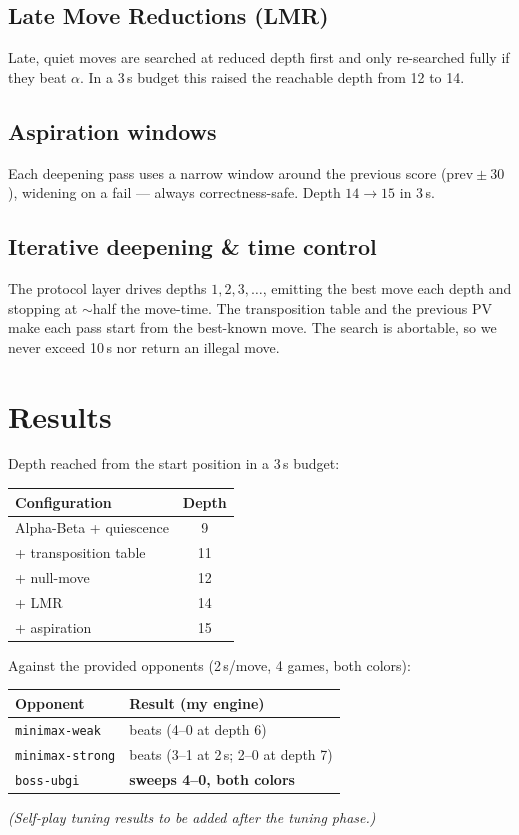 \documentclass[11pt]{article}
\begin{document}
\subsection{Late Move Reductions (LMR)}
Late, quiet moves are searched at reduced depth first and only re-searched fully
if they beat $\alpha$. In a 3\,s budget this raised the reachable depth from 12
to 14.

\subsection{Aspiration windows}
Each deepening pass uses a narrow window around the previous score
($\text{prev}\pm30$), widening on a fail --- always correctness-safe. Depth
$14\to15$ in 3\,s.

\subsection{Iterative deepening \& time control}
The protocol layer drives depths $1,2,3,\dots$, emitting the best move each
depth and stopping at $\sim$half the move-time. The transposition table and the
previous PV make each pass start from the best-known move. The search is
abortable, so we never exceed 10\,s nor return an illegal move.

\section{Results}
Depth reached from the start position in a 3\,s budget:
\begin{center}
\begin{tabular}{|l|c|}
\hline
Configuration & Depth \\ \hline
Alpha-Beta + quiescence & 9 \\
+ transposition table & 11 \\
+ null-move & 12 \\
+ LMR & 14 \\
+ aspiration & 15 \\ \hline
\end{tabular}
\end{center}

Against the provided opponents (2\,s/move, 4 games, both colors):
\begin{center}
\begin{tabular}{|l|l|}
\hline
Opponent & Result (my engine) \\ \hline
\texttt{minimax-weak} & beats (4--0 at depth 6) \\
\texttt{minimax-strong} & beats (3--1 at 2\,s; 2--0 at depth 7) \\
\texttt{boss-ubgi} & \textbf{sweeps 4--0, both colors} \\ \hline
\end{tabular}
\end{center}
\textit{(Self-play tuning results to be added after the tuning phase.)}
\end{document}
